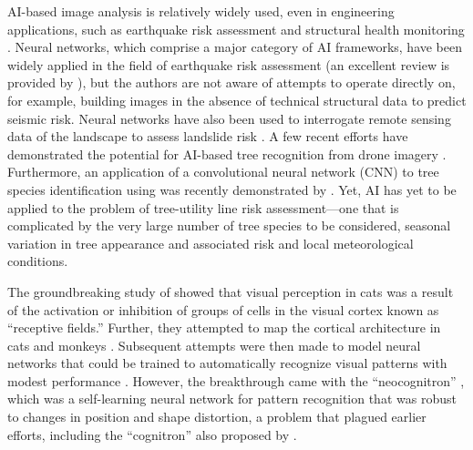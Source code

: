 \documentclass[Journal,letterpaper, SingleSpace, InsideFigs]{ascelike-new}
\begin{document}
AI-based image analysis is relatively widely used, even in engineering applications, such as earthquake risk assessment \cite{jiao2020artificial,salehi2018emerging} and structural health monitoring \cite{spencer2019advances,wang2019novel}. Neural networks, which comprise a major category of AI frameworks, have been widely applied in the field of earthquake risk assessment (an excellent review is provided by ), but the authors are not aware of attempts to operate directly on, for example, building images in the absence of technical structural data to predict seismic risk.  Neural networks have also been used to interrogate remote sensing data of the landscape to assess landslide risk \cite{su2020deep}.
A few recent efforts have demonstrated the potential for AI-based tree recognition from drone imagery \cite{santos2019assessment,egli2020cnnbased}. Furthermore, an application of a convolutional neural network (CNN) to tree species identification using was recently demonstrated by . 
Yet, AI has yet to be applied to the problem of tree-utility line risk assessment---one that is complicated by the very large number of tree species to be considered, seasonal variation in tree appearance and associated risk and local meteorological conditions. 


The groundbreaking study of  showed that visual perception in cats was a result of the
activation or inhibition of groups of cells in the visual cortex known as ``receptive fields.''  Further, they attempted
to map the cortical architecture in cats and monkeys \cite{hubel1962receptive,hubel1965receptive,hubel1968receptive}.
Subsequent attempts were then made to model neural networks that could be trained to automatically recognize visual patterns with modest performance \cite{rosenblatt1962principles,kabrisky1966proposed,giebel1971feature,fukushima1975cognitron}. However, the breakthrough came with the ``neocognitron'' \cite{fukushima1980neocognitron}, which
was a self-learning neural network for pattern recognition that was robust to changes in position and shape distortion, a problem that plagued earlier efforts, including the ``cognitron'' also proposed by . %
\end{document}
